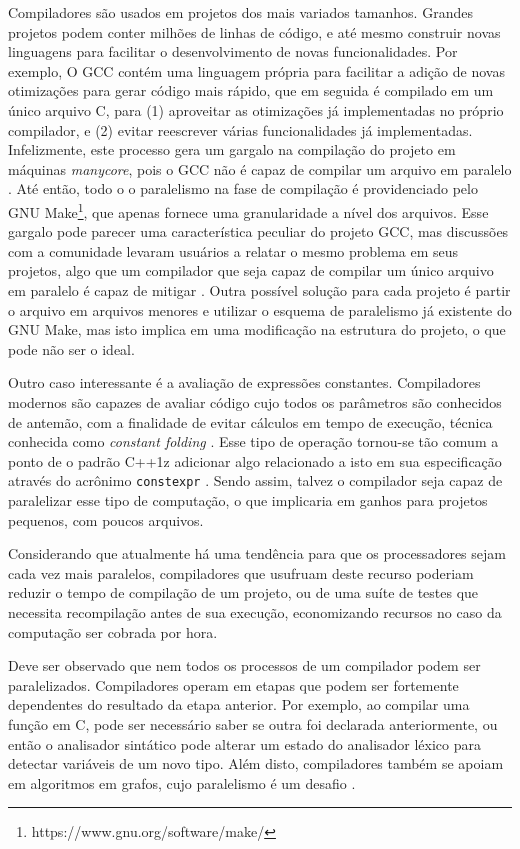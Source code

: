 Compiladores são usados em projetos dos mais variados tamanhos.
Grandes projetos podem conter milhões de linhas de código, e até mesmo
construir novas linguagens para facilitar o desenvolvimento de novas
funcionalidades. Por exemplo, O GCC contém uma linguagem própria para facilitar
a adição de novas otimizações para gerar código mais rápido, que em seguida é
compilado em um único arquivo C, para (1) aproveitar as otimizações já
implementadas no próprio compilador, e (2) evitar reescrever várias
funcionalidades já implementadas. Infelizmente, este processo
gera um gargalo na compilação do projeto em máquinas \textit{manycore}, pois o
GCC não é capaz de compilar um arquivo em paralelo \citep{pr84402}. Até então, todo o o
paralelismo na fase de compilação é providenciado pelo 
GNU Make\footnote{https://www.gnu.org/software/make/}, que apenas
fornece uma granularidade a nível dos arquivos. Esse gargalo pode parecer uma
característica peculiar do projeto GCC, mas discussões com a comunidade levaram
usuários a relatar o mesmo problema em seus projetos, algo que um compilador
que seja capaz de compilar um único arquivo em paralelo é capaz de mitigar
\citep{mailgcc} \citep{phoronix}. Outra possível solução para cada
projeto é partir o arquivo em arquivos menores e utilizar o esquema de
paralelismo já existente do GNU Make, mas isto implica em uma modificação na
estrutura do projeto, o que pode não ser o ideal.

Outro caso interessante é a avaliação de expressões constantes. Compiladores
modernos são capazes de avaliar código cujo todos os parâmetros são conhecidos
de antemão, com a finalidade de evitar cálculos em tempo de execução, técnica
conhecida como \textit{constant folding} \citep{dragonbook}. Esse tipo de
operação tornou-se tão comum a ponto de o padrão C++1z adicionar algo
relacionado a isto em sua especificação através do acrônimo \texttt{constexpr}
\citep{iso148822017}.
Sendo assim, talvez o compilador seja capaz de paralelizar esse tipo de
computação, o que implicaria em ganhos para projetos pequenos, com poucos
arquivos.

Considerando que atualmente há uma tendência para que os processadores sejam
cada vez mais paralelos, compiladores que usufruam deste recurso poderiam
reduzir o tempo de compilação de um projeto, ou de uma suíte de testes que
necessita recompilação antes de sua execução, economizando recursos no caso da
computação ser cobrada por hora.

Deve ser observado que nem todos os processos de um compilador podem ser
paralelizados. Compiladores operam em etapas que podem ser fortemente
dependentes do resultado da etapa anterior. Por exemplo, ao compilar uma
função em C, pode ser necessário saber se outra foi declarada anteriormente, ou
então o analisador sintático pode alterar um estado do analisador léxico para
detectar variáveis de um novo tipo. Além disto, compiladores também se apoiam em algoritmos
em grafos, cujo paralelismo é um desafio \citep{lumsdaine2007challenges}.

